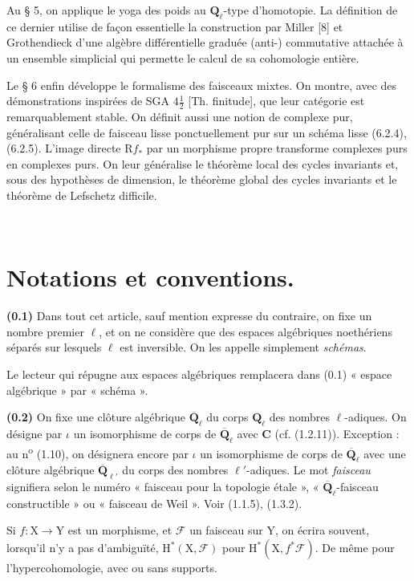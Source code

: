 \documentclass[11pt,leqno]{article}
\newcommand{\Page}[1]{\ifvmode\noindent\else\unskip\ \fi{\footnotesize\textcolor{gray}{[p.\,#1]}}\ \ignorespaces}
\begin{document}
Au § 5, on applique le yoga des poids au \(\mathbf{Q}_\ell\)-type d’homotopie. La définition de ce dernier utilise de façon essentielle la construction par Miller [8] et Grothendieck d’une algèbre différentielle graduée (anti-) commutative attachée à un ensemble simplicial qui permette le calcul de sa cohomologie entière.

Le § 6 enfin développe le formalisme des faisceaux mixtes. On montre, avec des démonstrations inspirées de SGA \(4\frac{1}{2}\) [Th. finitude], que leur catégorie est remarquablement stable. On définit aussi une notion de complexe pur, généralisant celle de faisceau lisse ponctuellement pur sur un schéma lisse (6.2.4), (6.2.5). L’image directe \(\mathrm{R}f_*\) par un morphisme propre transforme complexes purs en complexes purs. On leur généralise le théorème local des cycles invariants et, sous des hypothèses de dimension, le théorème global des cycles invariants et le théorème de Lefschetz difficile.

\Page{144}
\section*{Notations et conventions.}

\textbf{(0.1)} Dans tout cet article, sauf mention expresse du contraire, on fixe un nombre premier \(\ell\), et on ne considère que des espaces algébriques noethériens séparés sur lesquels \(\ell\) est inversible. On les appelle simplement \textit{schémas}.

Le lecteur qui répugne aux espaces algébriques remplacera dans (0.1) « espace algébrique » par « schéma ».

\textbf{(0.2)} On fixe une clôture algébrique \(\overline{\mathbf{Q}}_\ell\) du corps \(\mathbf{Q}_\ell\) des nombres \(\ell\)-adiques. On désigne par \(\iota\) un isomorphisme de corps de \(\overline{\mathbf{Q}}_\ell\) avec \(\mathbf{C}\) (cf. (1.2.11)). Exception : au n\textsuperscript{o} (1.10), on désignera encore par \(\iota\) un isomorphisme de corps de \(\overline{\mathbf{Q}}_\ell\) avec une clôture algébrique \(\overline{\mathbf{Q}}_{\ell'}\) du corps des nombres \(\ell'\)-adiques. Le mot \textit{faisceau} signifiera selon le numéro « faisceau pour la topologie étale », « \(\overline{\mathbf{Q}}_\ell\)-faisceau constructible » ou « faisceau de Weil ». Voir (1.1.5), (1.3.2).

Si \(f:\mathrm{X}\to\mathrm{Y}\) est un morphisme, et \(\mathscr{F}\) un faisceau sur \(\mathrm{Y}\), on écrira souvent, lorsqu’il n’y a pas d’ambiguïté, \(\mathrm{H}^*(\mathrm{X},\mathscr{F})\) pour \(\mathrm{H}^*(\mathrm{X},f^*\mathscr{F})\). De même pour l’hypercohomologie, avec ou sans supports.
\end{document}
